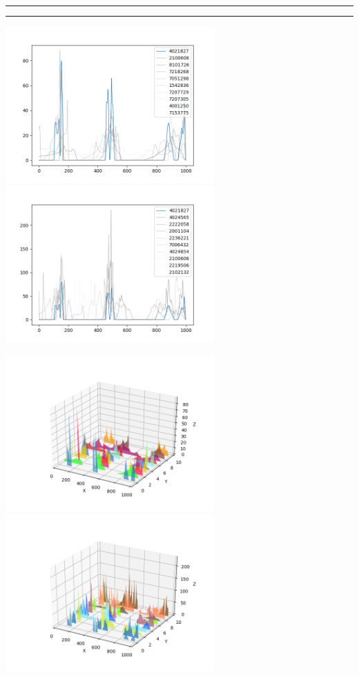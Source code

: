 \documentclass{article}
\begin{document}
\begin{center}
\noindent\rule{\textwidth}{1pt}

\noindent\rule{\textwidth}{1pt}

\includegraphics[height=6cm, width=8cm]{3.png}\includegraphics[height=6cm, width=8cm]{3_cos.png}

\includegraphics[height=6cm, width=8cm]{3_3d.png} \includegraphics[height=6cm, width=8cm]{3_cos_3d.png}


\end{center}
\end{document}
